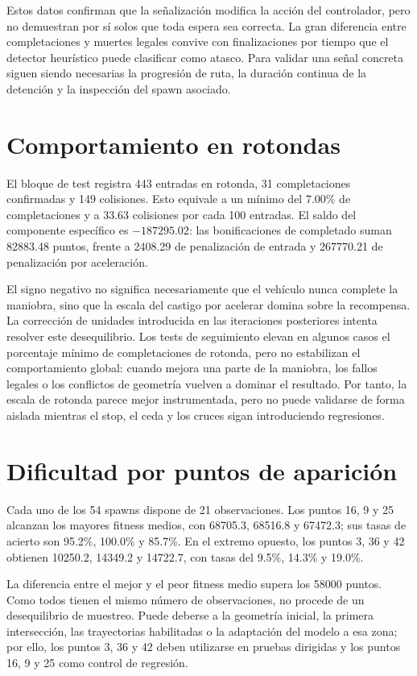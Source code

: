 Estos datos confirman que la señalización modifica la acción del controlador, pero no demuestran por sí solos que toda espera sea correcta. La gran diferencia entre completaciones y muertes legales convive con finalizaciones por tiempo que el detector heurístico puede clasificar como atasco. Para validar una señal concreta siguen siendo necesarias la progresión de ruta, la duración continua de la detención y la inspección del spawn asociado.

\section{Comportamiento en rotondas}

El bloque de test registra 443 entradas en rotonda, 31 completaciones confirmadas y 149 colisiones. Esto equivale a un mínimo del 7.00\% de completaciones y a 33.63 colisiones por cada 100 entradas. El saldo del componente específico es \(-187295.02\): las bonificaciones de completado suman 82883.48 puntos, frente a 2408.29 de penalización de entrada y 267770.21 de penalización por aceleración.

El signo negativo no significa necesariamente que el vehículo nunca complete la maniobra, sino que la escala del castigo por acelerar domina sobre la recompensa. La corrección de unidades introducida en las iteraciones posteriores intenta resolver este desequilibrio. Los tests de seguimiento elevan en algunos casos el porcentaje mínimo de completaciones de rotonda, pero no estabilizan el comportamiento global: cuando mejora una parte de la maniobra, los fallos legales o los conflictos de geometría vuelven a dominar el resultado. Por tanto, la escala de rotonda parece mejor instrumentada, pero no puede validarse de forma aislada mientras el stop, el ceda y los cruces sigan introduciendo regresiones.

\section{Dificultad por puntos de aparición}

Cada uno de los 54 spawns dispone de 21 observaciones. Los puntos 16, 9 y 25 alcanzan los mayores fitness medios, con 68705.3, 68516.8 y 67472.3; sus tasas de acierto son 95.2\%, 100.0\% y 85.7\%. En el extremo opuesto, los puntos 3, 36 y 42 obtienen 10250.2, 14349.2 y 14722.7, con tasas del 9.5\%, 14.3\% y 19.0\%.

La diferencia entre el mejor y el peor fitness medio supera los 58000 puntos. Como todos tienen el mismo número de observaciones, no procede de un desequilibrio de muestreo. Puede deberse a la geometría inicial, la primera intersección, las trayectorias habilitadas o la adaptación del modelo a esa zona; por ello, los puntos 3, 36 y 42 deben utilizarse en pruebas dirigidas y los puntos 16, 9 y 25 como control de regresión.

